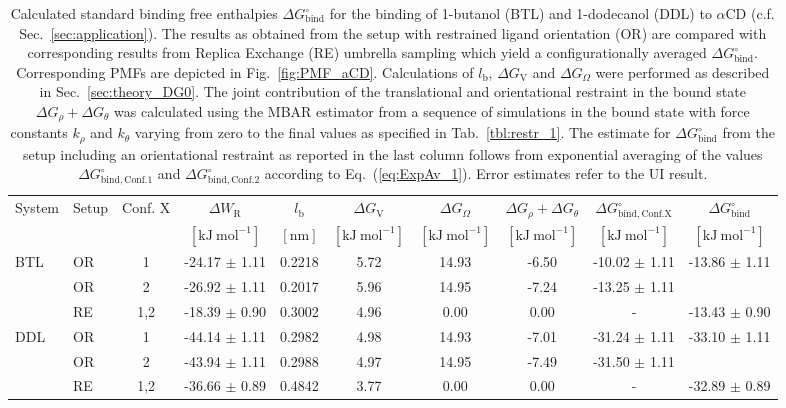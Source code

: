 \documentclass[9pt,lessons,pubversion]{livecoms}
\begin{document}
\begin{table}[ht]
\caption{\label{tbl:aCD} 
Calculated standard binding free enthalpies $\Delta G^\circ_\mathrm{bind}$ for the binding of 1-butanol (BTL) and 1-dodecanol (DDL) to $\alpha$CD (c.f. Sec.~\ref{sec:application}).
The results as obtained from the setup with restrained ligand orientation (OR) are compared with corresponding results from Replica Exchange (RE) umbrella sampling which yield a configurationally averaged 
$\Delta G^\circ_\mathrm{bind}$. 
Corresponding PMFs are depicted in Fig.~\ref{fig:PMF_aCD}. 
Calculations of $l_\mathrm{b}$,  $\Delta G_\mathrm{V}$ and $\Delta G_\Omega$ were performed as described in Sec.~\ref{sec:theory_DG0}. 
The joint contribution of the translational and orientational restraint in the bound state $\Delta G_\rho + \Delta G_\theta$ was calculated using the MBAR estimator from a sequence of simulations in the bound state with force constants $k_\rho$ and $k_\theta$ varying from zero to the final values as specified in Tab.~\ref{tbl:restr_1}.
The estimate for $\Delta G^\circ_\mathrm{bind}$ from the setup including an orientational restraint as reported in the last column follows from 
exponential averaging of the values $\Delta G^\circ_\mathrm{bind, Conf. 1}$ and $\Delta G^\circ_\mathrm{bind, Conf. 2}$ according to Eq.~(\ref{eq:ExpAv_1}).
Error estimates refer to the UI result.
}
\centering
\begin{tabular}{llcc ccc ccc}\hline
System & Setup & Conf. X & $\Delta W_\mathrm{R}$  & $l_\mathrm{b}$ & $\Delta G_\mathrm{V}$ & $\Delta G_\Omega$ & 
$\Delta G_\rho + \Delta G_\theta$ & $\Delta G^\circ_\mathrm{bind, Conf. X}$ & $\Delta G^\circ_\mathrm{bind}$ \\
& & & $[\mathrm{kJ~mol}^{-1}]$ & $[\mathrm{nm}]$ &  $[\mathrm{kJ~mol}^{-1}]$ & $[\mathrm{kJ~mol}^{-1}]$ & $[\mathrm{kJ~mol}^{-1}]$ & $[\mathrm{kJ~mol}^{-1}]$ & $[\mathrm{kJ~mol}^{-1}]$ \\ 
\hline
\multirow{ 3}{*}{BTL} & OR & 1 & -24.17 $\pm$ 1.11 & 0.2218 &  5.72 &  14.93 &  -6.50 &  -10.02 $\pm$ 1.11  & \multirow{ 2}{*}{-13.86 $\pm$ 1.11 } \\   
				& OR & 2 & -26.92 $\pm$ 1.11 & 0.2017  &  5.96 &  14.95 &  -7.24 &  -13.25 $\pm$ 1.11  \\
				& RE &1,2 & -18.39 $\pm$ 0.90 & 0.3002  &  4.96 &  0.00 &  0.00 &  - & -13.43 $\pm$ 0.90 \\ 
\hline
\multirow{ 3}{*}{DDL} & OR & 1 & -44.14 $\pm$ 1.11 & 0.2982  &  4.98 &  14.93 &  -7.01 &  -31.24 $\pm$ 1.11  & \multirow{ 2}{*}{-33.10 $\pm$ 1.11 } \\    
				& OR & 2 & -43.94 $\pm$ 1.11 & 0.2988   &  4.97 &  14.95 &  -7.49 &  -31.50 $\pm$ 1.11  \\
				& RE &1,2 & -36.66 $\pm$ 0.89 & 0.4842  &  3.77 &  0.00  &  0.00 &  - & -32.89 $\pm$ 0.89 \\ 
\hline
\end{tabular}
\end{table}
\end{document}
